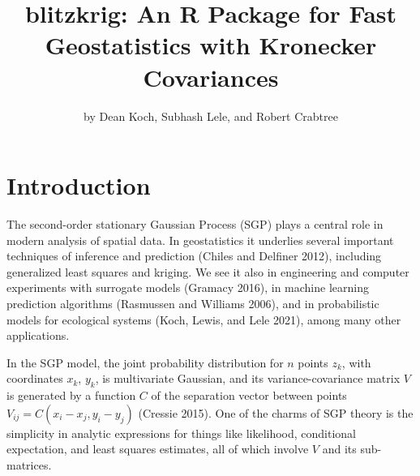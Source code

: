 \title{blitzkrig: An R Package for Fast Geostatistics with Kronecker Covariances}
\author{by Dean Koch, Subhash Lele, and Robert Crabtree}

\maketitle


\hypertarget{introduction}{%
\section{Introduction}\label{introduction}}

The second-order stationary Gaussian Process (SGP) plays a central role in modern analysis of spatial data. In geostatistics it underlies several important techniques of inference and prediction (Chiles and Delfiner 2012), including generalized least squares and kriging. We see it also in engineering and computer experiments with surrogate models (Gramacy 2016), in machine learning prediction algorithms (Rasmussen and Williams 2006), and in probabilistic models for ecological systems (Koch, Lewis, and Lele 2021), among many other applications.

In the SGP model, the joint probability distribution for \(n\) points \(z_k\), with coordinates \(x_k\), \(y_k\), is multivariate Gaussian, and its variance-covariance matrix \(V\) is generated by a function \(C\) of the separation vector between points \(V_{ij} = C ( x_i - x_j, y_i - y_j )\) (Cressie 2015). One of the charms of SGP theory is the simplicity in analytic expressions for things like likelihood, conditional expectation, and least squares estimates, all of which involve \(V\) and its sub-matrices.

